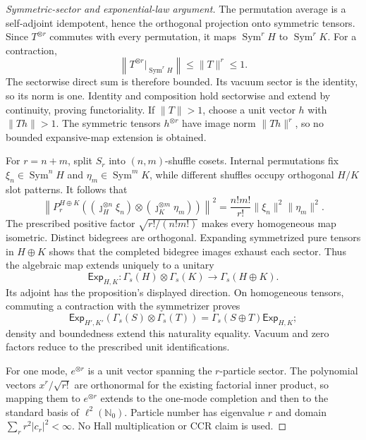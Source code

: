 \begin{proof}[Symmetric-sector and exponential-law argument]
The permutation average is a self-adjoint idempotent, hence the orthogonal
projection onto symmetric tensors. Since $T^{\otimes r}$ commutes with every
permutation, it maps $\operatorname{Sym}^rH$ to
$\operatorname{Sym}^rK$. For a contraction,
\[
 \left\|T^{\otimes r}|_{\operatorname{Sym}^rH}\right\|
 \leq\|T\|^r\leq1.
\]
The sectorwise direct sum is therefore bounded. Its vacuum sector is the
identity, so its norm is one. Identity and composition hold sectorwise and
extend by continuity, proving functoriality. If $\|T\|>1$, choose a unit vector $h$ with $\|Th\|>1$. The symmetric
tensors $h^{\otimes r}$ have image norm $\|Th\|^r$, so no bounded
expansive-map extension is obtained.

For $r=n+m$, split $S_r$ into $(n,m)$-shuffle cosets. Internal permutations
fix $\xi_n\in\operatorname{Sym}^nH$ and
$\eta_m\in\operatorname{Sym}^mK$, while different shuffles occupy orthogonal
$H/K$ slot patterns. It follows that
\[
 \left\|P_r^{H\oplus K}
 ((\jmath_H^{\otimes n}\xi_n)\otimes
  (\jmath_K^{\otimes m}\eta_m))\right\|^2
 =\frac{n!m!}{r!}\|\xi_n\|^2\|\eta_m\|^2.
\]
The prescribed positive factor $\sqrt{r!/(n!m!)}$ makes every homogeneous
map isometric. Distinct bidegrees are orthogonal. Expanding symmetrized pure
tensors in $H\oplus K$ shows that the completed bidegree images exhaust each
sector. Thus the algebraic map extends uniquely to a unitary
\[
 \mathsf{Exp}_{H,K}:\Gamma_s(H)\otimes\Gamma_s(K)
 \longrightarrow\Gamma_s(H\oplus K).
\]
Its adjoint has the proposition's displayed direction. On homogeneous
tensors, commuting a contraction with the symmetrizer proves
\[
 \mathsf{Exp}_{H',K'}(\Gamma_s(S)\otimes\Gamma_s(T))
 =\Gamma_s(S\oplus T)\mathsf{Exp}_{H,K};
\]
density and boundedness extend this naturality equality. Vacuum and zero
factors reduce to the prescribed unit identifications.

For one mode, $e^{\otimes r}$ is a unit vector spanning the $r$-particle
sector. The polynomial vectors $x^r/\sqrt{r!}$ are orthonormal for the
existing factorial inner product, so mapping them to $e^{\otimes r}$ extends
to the one-mode completion and then to the standard basis of
$\ell^2(\mathbb N_0)$. Particle number has eigenvalue $r$ and domain
$\sum_r r^2|c_r|^2<\infty$. No Hall multiplication or CCR claim is used.
\end{proof}

